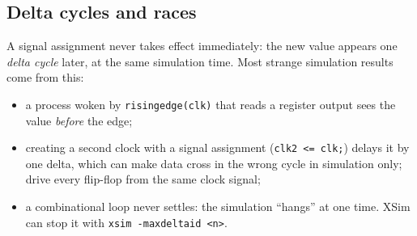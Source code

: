 \documentclass[11pt,a4paper]{article}
\newcommand{\code}[1]{\texttt{#1}}
\renewcommand{\_}{\oldunderscore\allowbreak{}}
\begin{document}
\subsection{Delta cycles and races}\label{sec:delta}
A signal assignment never takes effect immediately: the new value appears one \emph{delta cycle} later, at the same simulation time. Most strange simulation results come from this:
\begin{itemize}[nosep]
  \item a process woken by \code{rising\_edge(clk)} that reads a register output sees the value \emph{before} the edge;
  \item creating a second clock with a signal assignment (\code{clk2 <= clk;}) delays it by one delta, which can make data cross in the wrong cycle in simulation only; drive every flip-flop from the same clock signal;
  \item a combinational loop never settles: the simulation ``hangs'' at one time. XSim can stop it with \code{xsim -maxdeltaid <n>}.
\end{itemize}
\end{document}
